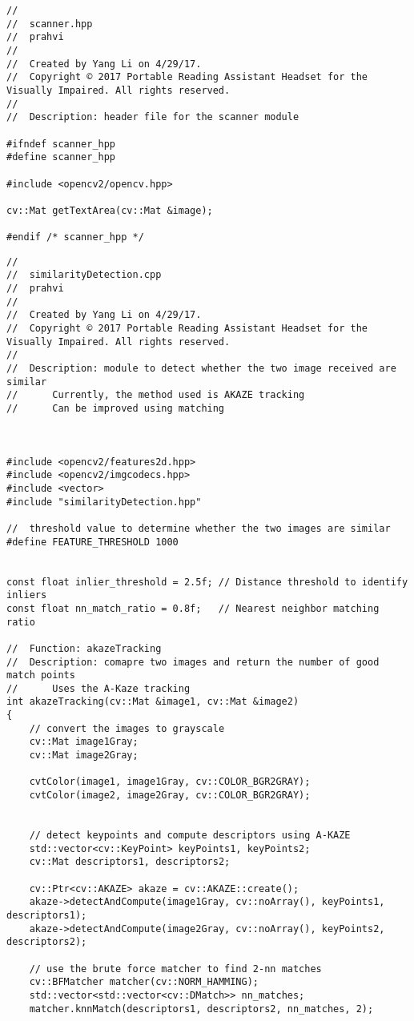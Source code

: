 \begin{lstlisting}
//
//  scanner.hpp
//  prahvi
//
//  Created by Yang Li on 4/29/17.
//  Copyright © 2017 Portable Reading Assistant Headset for the Visually Impaired. All rights reserved.
//
//	Description: header file for the scanner module

#ifndef scanner_hpp
#define scanner_hpp

#include <opencv2/opencv.hpp>

cv::Mat getTextArea(cv::Mat &image);

#endif /* scanner_hpp */

\end{lstlisting}

\begin{lstlisting}
//
//  similarityDetection.cpp
//  prahvi
//
//  Created by Yang Li on 4/29/17.
//  Copyright © 2017 Portable Reading Assistant Headset for the Visually Impaired. All rights reserved.
//
//	Description: module to detect whether the two image received are similar
//		Currently, the method used is AKAZE tracking
//		Can be improved using matching



#include <opencv2/features2d.hpp>
#include <opencv2/imgcodecs.hpp>
#include <vector>
#include "similarityDetection.hpp"

//	threshold value to determine whether the two images are similar
#define FEATURE_THRESHOLD 1000


const float inlier_threshold = 2.5f; // Distance threshold to identify inliers
const float nn_match_ratio = 0.8f;   // Nearest neighbor matching ratio

//	Function: akazeTracking
//	Description: comapre two images and return the number of good match points
//		Uses the A-Kaze tracking
int akazeTracking(cv::Mat &image1, cv::Mat &image2)
{
	// convert the images to grayscale
	cv::Mat image1Gray;
	cv::Mat image2Gray;
	
	cvtColor(image1, image1Gray, cv::COLOR_BGR2GRAY);
	cvtColor(image2, image2Gray, cv::COLOR_BGR2GRAY);
	
	
	// detect keypoints and compute descriptors using A-KAZE
	std::vector<cv::KeyPoint> keyPoints1, keyPoints2;
	cv::Mat descriptors1, descriptors2;
	
	cv::Ptr<cv::AKAZE> akaze = cv::AKAZE::create();
	akaze->detectAndCompute(image1Gray, cv::noArray(), keyPoints1, descriptors1);
	akaze->detectAndCompute(image2Gray, cv::noArray(), keyPoints2, descriptors2);
	
	// use the brute force matcher to find 2-nn matches
	cv::BFMatcher matcher(cv::NORM_HAMMING);
	std::vector<std::vector<cv::DMatch>> nn_matches;
	matcher.knnMatch(descriptors1, descriptors2, nn_matches, 2);
	

\end{lstlisting}
